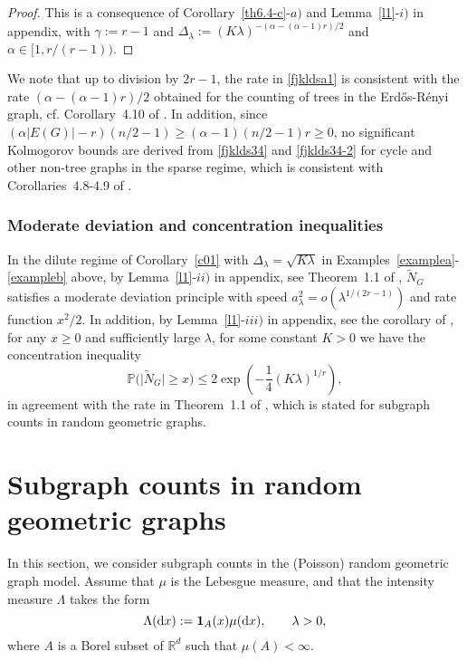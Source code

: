 \documentclass[bj,authoryear,noshowframe]{imsart}
\theoremstyle{plain}
\theoremstyle{remark}
\def\P{\mathbb{P}}
\def\real{{\mathord{\mathbb R}}}
\begin{document}
 \begin{proof}
   This is a consequence of 
   Corollary~\ref{th6.4-c}-$a)$
   and Lemma~\ref{l1}-$i)$ in appendix,
   with $\gamma :=r-1$ and 
   $\Delta_\lambda:=
   (K \lambda )^{ - (
  \alpha   -(\alpha - 1)r 
     )/2}$
   and $\alpha \in [1, r/(r-1) )$. 
 \end{proof} 
   We note that  up to division by $2r - 1$,
    the rate in \eqref{fjkldsa1} is consistent  
  with the rate $(
  \alpha    -(\alpha - 1)r 
      ) / 2$ obtained for the counting of trees in the
  Erd{\H o}s-R\'enyi graph, cf. Corollary~4.10 of \cite{PS2}. 
  In addition, since 
 $
 (\alpha |E(G)|-r)(n/2-1)
 \geq
 (\alpha -1)(n/2-1)r \geq 0$,
 no significant Kolmogorov bounds
 are derived from \eqref{fjklds34}
 and \eqref{fjklds34-2} 
 for cycle and other non-tree graphs 
 in the sparse regime,
 which is consistent with
 Corollaries~4.8-4.9 of \cite{PS2}. 
 
 \subsubsection*{Moderate deviation and concentration inequalities} 
 \noindent 
 In the dilute regime of Corollary~\ref{c01}
 with $\Delta_\lambda = \sqrt{K \lambda}$
  in Examples~\ref{examplea}-\ref{exampleb} above, 
 by Lemma~\ref{l1}-$ii)$ in appendix, see Theorem~1.1 of \cite{doring}, 
     $\widetilde{N}_G$
     satisfies a moderate deviation principle
     with speed $a_\lambda^2 = o( \lambda^{1/(2r - 1)} )$ and rate function $x^2/2$.
     In addition,
 by Lemma~\ref{l1}-$iii)$ in appendix,
 see the corollary of \cite[Lemma~2.4]{saulis},
 for any $x\ge0$ and sufficiently large $\lambda$,
 for some constant $K>0$ 
 we have the concentration inequality 
 \begin{equation}
 \label{concentrationineq}
   \P \big( \big| \widetilde{N}_G \big|
   \geq x)\le2\exp\left(-
   \frac{1}{4} 
    ( K \lambda)^{1/r}
    \right), 
 \end{equation} 
 in agreement with the rate in Theorem~1.1 of \cite{bachmann},
 which is stated for subgraph counts in random geometric
 graphs. 
 \vspace{-0.1cm}
 \section{Subgraph counts in random geometric graphs}
 \label{rgg}
 \vspace{-0.1cm}
 \noindent
 In this section, we consider subgraph counts in
 the (Poisson) random geometric graph model.
 Assume that $\mu$ is the Lebesgue measure,
 and that the intensity measure $\Lambda$ takes the form 
 $$\Lambda (\mathrm{d}x) := {\bf 1}_A (x) \mu(\mathrm{d}x),\qquad\lambda>0,$$
   where $A$ is a Borel subset of $\real^d$
   such that $\mu (A)<\infty$. 
 
\end{document}
